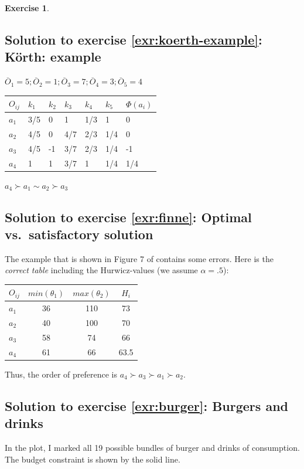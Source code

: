\documentclass[
  12pt,
  oneside]{book}
\theoremstyle{definition}
\theoremstyle{definition}
\theoremstyle{definition}
\newtheorem{exercise}{Exercise}[chapter]
\theoremstyle{definition}
\theoremstyle{remark}
\begin{document}
\begin{exercise}
\hypertarget{sol:koerth-example}{%
\subsection*{Solution to exercise \ref{exr:koerth-example}: Körth: example}\label{sol:koerth-example}}

\(\overline{O}_1=5; \overline{O}_2=1; \overline{O}_3=7; \overline{O}_4=3; \overline{O}_5=4\)

\begin{longtable}[]{@{}lllllll@{}}
\toprule()
\(O_{ij}\) & \(k_1\) & \(k_2\) & \(k_3\) & \(k_4\) & \(k_5\) & \(\Phi(a_i)\) \\
\midrule()
\endhead
\(a_1\) & 3/5 & 0 & 1 & 1/3 & 1 & 0 \\
\(a_2\) & 4/5 & 0 & 4/7 & 2/3 & 1/4 & 0 \\
\(a_3\) & 4/5 & -1 & 3/7 & 2/3 & 1/4 & -1 \\
\(a_4\) & 1 & 1 & 3/7 & 1 & 1/4 & 1/4 \\
\bottomrule()
\end{longtable}

\(a_4\succ a_1 \sim a_2 \succ a_3\)

\hypertarget{sol:finne}{%
\subsection*{Solution to exercise \ref{exr:finne}: Optimal vs.~satisfactory solution}\label{sol:finne}}

The example that is shown in Figure 7 of \citet[p.~401]{Finne1998three} contains some errors. Here is the \emph{correct table} including the Hurwicz-values (we assume \(\alpha=.5\)):

\begin{longtable}[]{@{}lccc@{}}
\toprule()
\(O_{ij}\) & \(min(\theta_1)\) & \(max(\theta_2)\) & \(H_i\) \\
\midrule()
\endhead
\(a_1\) & 36 & 110 & 73 \\
\(a_2\) & 40 & 100 & 70 \\
\(a_3\) & 58 & 74 & 66 \\
\(a_4\) & 61 & 66 & 63.5 \\
\bottomrule()
\end{longtable}

Thus, the order of preference is \(a_4\succ a_3 \succ a_1 \succ a_2\).

\hypertarget{sol:burger}{%
\subsection*{Solution to exercise \ref{exr:burger}: Burgers and drinks}\label{sol:burger}}

In the plot, I marked all 19 possible bundles of burger and drinks of consumption. The budget constraint is shown by the solid line.
\end{exercise}
\end{document}
